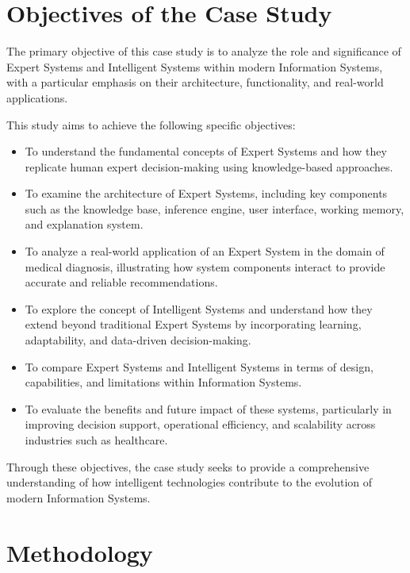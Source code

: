 \documentclass[12pt]{article}
\begin{document}
\newpage
\section{Objectives of the Case Study}

The primary objective of this case study is to analyze the role and significance of Expert Systems and Intelligent Systems within modern Information Systems, with a particular emphasis on their architecture, functionality, and real-world applications.

This study aims to achieve the following specific objectives:

\begin{itemize}
    \item To understand the fundamental concepts of Expert Systems and how they replicate human expert decision-making using knowledge-based approaches.
    
    \item To examine the architecture of Expert Systems, including key components such as the knowledge base, inference engine, user interface, working memory, and explanation system.
    
    \item To analyze a real-world application of an Expert System in the domain of medical diagnosis, illustrating how system components interact to provide accurate and reliable recommendations.
    
    \item To explore the concept of Intelligent Systems and understand how they extend beyond traditional Expert Systems by incorporating learning, adaptability, and data-driven decision-making.
    
    \item To compare Expert Systems and Intelligent Systems in terms of design, capabilities, and limitations within Information Systems.
    
    \item To evaluate the benefits and future impact of these systems, particularly in improving decision support, operational efficiency, and scalability across industries such as healthcare.
\end{itemize}

Through these objectives, the case study seeks to provide a comprehensive understanding of how intelligent technologies contribute to the evolution of modern Information Systems.


\newpage
\section{Methodology}
\end{document}
